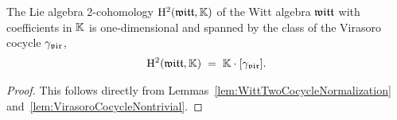 \begin{lemma}
  \label{lem:WittTwoCohomologyIsOneDimensional}
  \leanok
  The Lie algebra 2-cohomology $\mathrm{H}^2(\mathfrak{witt},\mathbb{K})$ of the Witt
  algebra $\mathfrak{witt}$ with coefficients in $\mathbb{K}$ is one-dimensional
  and spanned by the class of the Virasoro cocycle ${\gamma}_{\mathfrak{vir}}$,
  \begin{align*}
    \mathrm{H}^2(\mathfrak{witt},\mathbb{K}) \; = \; \mathbb{K} \cdot [{\gamma}_{\mathfrak{vir}}] .
  \end{align*}
\end{lemma}
\begin{proof}
  \leanok
  This follows directly from
  Lemmas~\ref{lem:WittTwoCocycleNormalization}
  and~\ref{lem:VirasoroCocycleNontrivial}.
\end{proof}
